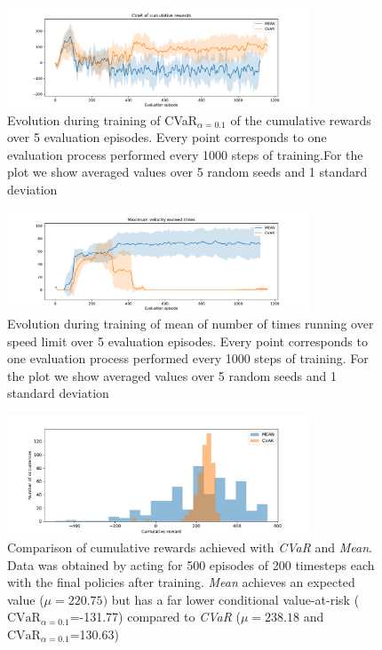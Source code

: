 \begin{figure}[ht]
        \centering
        \includegraphics[width=0.8\textwidth]{images/Cheetah_offpolicy_medium/cvar_train_withstds.pdf}
        \caption{Evolution during training of CVaR$_{\alpha=0.1}$ of the cumulative rewards over 5 evaluation episodes.
        Every point corresponds to one evaluation process performed every 1000 steps of training.For the plot we
        show averaged values over 5 random seeds and 1 standard deviation}
        \label{fig:cvar_cheetah}
    
\end{figure}


\begin{figure}[ht]
    \centering
    \includegraphics[width=0.8\textwidth]{images/Cheetah_offpolicy_medium/times_exceedvel_withstds.pdf}
    \caption{Evolution during training of mean of number of times running over speed limit over 5 evaluation episodes.
    Every point corresponds to one evaluation process performed every 1000 steps of training.
    For the plot we show averaged values over 5 random seeds and 1 standard deviation}
    \label{fig:vel_exceed_cheetah}

\end{figure}

\begin{figure}[ht]
    \centering
    \includegraphics[width=0.8\textwidth]{images/Cheetah_offpolicy_medium/hist_evaluation_numevalsteps200_500eps.pdf}
    \caption{Comparison of cumulative rewards achieved with \textit{CVaR} and \textit{Mean}.
    Data was obtained by acting for 500 episodes of 200 timesteps each with the final policies after training.
    \textit{Mean} achieves an expected value  ($\mu=220.75)$  but 
    has a far lower conditional value-at-risk ($\text{CVaR}_{\alpha= 0.1}$=-131.77) compared to
    \textit{CVaR} ($\mu=238.18$ and $\text{CVaR}_{\alpha= 0.1}$=130.63)}
    \label{fig:hist_cum_rewards200steps_cheetah}
\end{figure}

